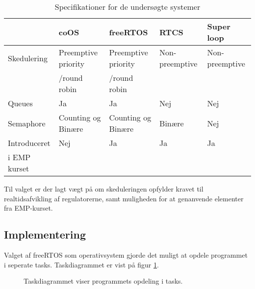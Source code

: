 \begin{table}[h!]
\begin{tabular}{|l|l|l|l|l|}
\hline 
 & coOS & freeRTOS & RTCS & Super loop \\ 
\hline 
Skedulering & Preemptive priority  & Preemptive priority  & Non-preemptive & Non-preemptive  \\ 
			& /round robin		&	/round robin & &	\\
\hline 
Queues & Ja & Ja & Nej & Nej \\ 
\hline 
Semaphore & Counting og Binære  & Counting og Binære & Binære  & Nej  \\ 
\hline 
Introduceret & Nej & Ja & Ja & Ja \\ 
i EMP kurset &   &   &   &   \\
\hline 
\end{tabular} 
\caption{Specifikationer for de undersøgte systemer}
\label{tb:os_comparison}
\end{table}

Til valget er der lagt vægt på om skeduleringen opfylder kravet til realtidsafvikling af regulatorerne, samt muligheden for at genanvende elementer fra EMP-kurset.

%
\subsection{Implementering}
% 
% 

Valget af freeRTOS som operativsystem gjorde det muligt at opdele programmet i seperate tasks. Taskdiagrammet er vist på figur \ref{fig:task_diagram}. 

\begin{figure}[!h]
\centering
\begin{tikzpicture}[node distance = 3.2cm]
	
\end{tikzpicture}
\caption[Task diagram]{Taskdiagrammet viser programmets opdeling i tasks.}
\label{fig:task_diagram}
\end{figure}


